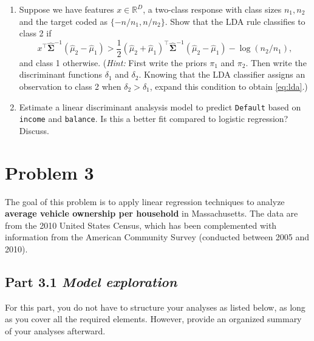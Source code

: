 \documentclass[11pt,twoside]{article}
\newcommand{\pts}[1]{\marginpar{ \small\hspace{0pt} \textit{[#1]} } }
\newcommand{\?}{\stackrel{?}{=}}
\newcommand{\fr}{\frac}
\begin{document}
\begin{enumerate}[\bf (a)]
\item Suppose we have features \pts{8} $x \in \mathbb{R}^D$, a two-class response with class sizes $n_1, n_2$ and the target coded as $\{-n/n_1, n/n_2\}$.
Show that the LDA rule classifies to class 2 if
\begin{equation}
 \label{eq:lda}
  x^\intercal \hat{\bm{\Sigma}}^{-1}(\hat\mu_2 - \hat\mu_1) > \fr12(\hat\mu_2 + \hat\mu_1)^\intercal\hat{\bm{\Sigma}}^{-1}(\hat\mu_2 - \hat\mu_1) - \log(n_2/n_1),
\end{equation}
and class 1 otherwise. (\textit{Hint:} First write the priors $\pi_{1}$ and $\pi_{2}$. Then write the discriminant functions $\delta_{1}$ and $\delta_{2}$. Knowing that the LDA classifier assigns an observation to class 2 when $\delta_{2} > \delta_{1}$, expand this condition to obtain \eqref{eq:lda}.)

\item Estimate a \pts{5} linear discriminant analsysis model to predict \texttt{Default} based on \texttt{income} and \texttt{balance}.
  Is this a better fit compared to logistic regression? Discuss.
  
\end{enumerate}



\section*{Problem 3 }
The goal of this problem  is to apply linear regression techniques  to analyze \textbf{average vehicle ownership per household} in Massachusetts.
The data are from the 2010 United States Census, which has been complemented with information from the American Community Survey (conducted between 2005 and 2010).


\subsection*{Part 3.1 {\it Model exploration}}
For this part, you do not have to structure your analyses as listed below, as long as you cover all the required
elements.  However, provide an organized summary of your analyses afterward.
  
\end{document}
